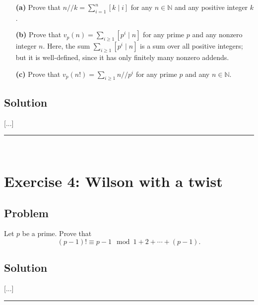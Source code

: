 \documentclass[paper=a4, fontsize=12pt]{scrartcl} %
\newcommand{\NN}{\mathbb{N}} %
\newcommand{\tup}[1]{\left( #1 \right)}
\newcommand{\ive}[1]{\left[ #1 \right]}
\newcommand{\horrule}[1]{\rule{\linewidth}{#1}} %
\let\sumnonlimits\sum
\renewcommand{\sum}{\sumnonlimits\limits}
\theoremstyle{plainsl}
\theoremstyle{definition}
\theoremstyle{remark}
\begin{document}
\begin{enumerate}

\item[\textbf{(a)}]
Prove that $n // k = \sum_{i=1}^n \ive{k \mid i}$
for any $n \in \NN$ and any positive integer $k$.

\item[\textbf{(b)}]
Prove that $v_p \tup{n} = \sum_{i \geq 1} \ive{p^i \mid n}$
for any prime $p$ and any nonzero integer $n$.
Here, the sum $\sum_{i \geq 1} \ive{p^i \mid n}$ is
a sum over all positive integers; but it is
well-defined, since it has only finitely many nonzero
addends.

\item[\textbf{(c)}]
Prove that
$v_p \tup{n!} = \sum_{i \geq 1} n // p^i$ for any
prime $p$ and any $n \in \NN$.

\end{enumerate}

\subsection{Solution}

[...]

\horrule{0.3pt} \\[0.4cm]

\section{Exercise 4: Wilson with a twist}

\subsection{Problem}

Let $p$ be a prime.
Prove that
\[
\tup{p-1}! \equiv p-1
\mod 1 + 2 + \cdots + \tup{p-1} .
\]

\subsection{Solution}

[...]

\horrule{0.3pt} \\[0.4cm]
\end{document}
